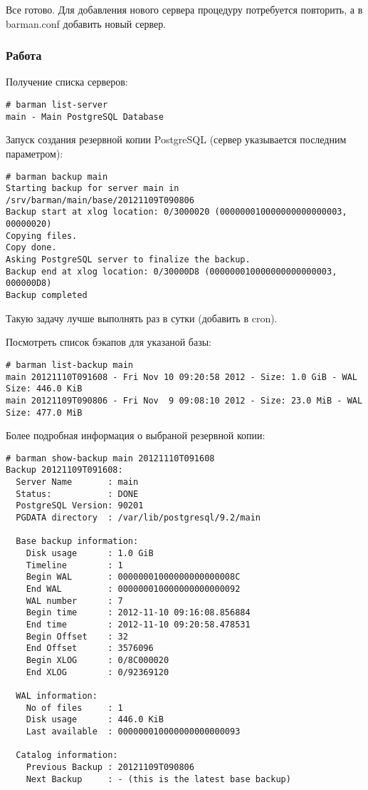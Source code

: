 Все готово. Для добавления нового сервера процедуру потребуется повторить, а в barman.conf добавить новый сервер.

\subsubsection{Работа}

Получение списка серверов:

\begin{lstlisting}[label=lst:barman12,caption=Список серверов]
# barman list-server
main - Main PostgreSQL Database
\end{lstlisting}

Запуск создания резервной копии PostgreSQL (сервер указывается последним параметром):

\begin{lstlisting}[label=lst:barman13,caption=Создание бэкапа]
# barman backup main
Starting backup for server main in /srv/barman/main/base/20121109T090806
Backup start at xlog location: 0/3000020 (000000010000000000000003, 00000020)
Copying files.
Copy done.
Asking PostgreSQL server to finalize the backup.
Backup end at xlog location: 0/30000D8 (000000010000000000000003, 000000D8)
Backup completed
\end{lstlisting}

Такую задачу лучше выполнять раз в сутки (добавить в cron). 

Посмотреть список бэкапов для указаной базы:

\begin{lstlisting}[label=lst:barman14,caption=Список бэкапов]
# barman list-backup main
main 20121110T091608 - Fri Nov 10 09:20:58 2012 - Size: 1.0 GiB - WAL Size: 446.0 KiB
main 20121109T090806 - Fri Nov  9 09:08:10 2012 - Size: 23.0 MiB - WAL Size: 477.0 MiB
\end{lstlisting}

Более подробная информация о выбраной резервной копии:

\begin{lstlisting}[label=lst:barman15,caption=Информация о выбраной резервной копии]
# barman show-backup main 20121110T091608
Backup 20121109T091608:
  Server Name       : main
  Status:           : DONE
  PostgreSQL Version: 90201
  PGDATA directory  : /var/lib/postgresql/9.2/main

  Base backup information:
    Disk usage      : 1.0 GiB
    Timeline        : 1
    Begin WAL       : 00000001000000000000008C
    End WAL         : 000000010000000000000092
    WAL number      : 7
    Begin time      : 2012-11-10 09:16:08.856884
    End time        : 2012-11-10 09:20:58.478531
    Begin Offset    : 32
    End Offset      : 3576096
    Begin XLOG      : 0/8C000020
    End XLOG        : 0/92369120

  WAL information:
    No of files     : 1
    Disk usage      : 446.0 KiB
    Last available  : 000000010000000000000093

  Catalog information:
    Previous Backup : 20121109T090806
    Next Backup     : - (this is the latest base backup)
\end{lstlisting}

